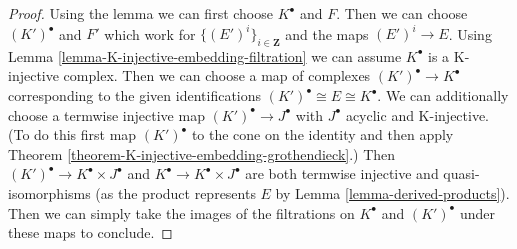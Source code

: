 \begin{proof}
Using the lemma we can first choose $K^\bullet$ and $F$.
Then we can choose $(K')^\bullet$ and $F'$ which work for
$\{(E')^i\}_{i \in \mathbf{Z}}$ and the maps $(E')^i \to E$.
Using Lemma \ref{lemma-K-injective-embedding-filtration}
we can assume $K^\bullet$ is a K-injective complex.
Then we can choose a map of complexes
$(K')^\bullet \to K^\bullet$ corresponding to
the given identifications
$(K')^\bullet \cong E \cong K^\bullet$.
We can additionally choose a termwise injective
map $(K')^\bullet \to J^\bullet$ with
$J^\bullet$ acyclic and K-injective.
(To do this first map $(K')^\bullet$ to the cone on the identity
and then apply Theorem \ref{theorem-K-injective-embedding-grothendieck}.)
Then $(K')^\bullet \to K^\bullet \times J^\bullet$ and
$K^\bullet \to K^\bullet \times J^\bullet$
are both termwise injective and quasi-isomorphisms
(as the product represents $E$ by Lemma \ref{lemma-derived-products}).
Then we can simply take the images of the filtrations
on $K^\bullet$ and $(K')^\bullet$ under these maps to conclude.
\end{proof}













